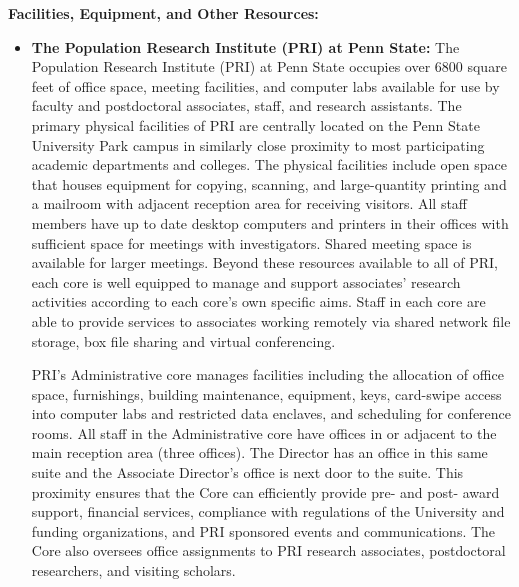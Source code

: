 \documentclass[11pt]{article}
\begin{document}
%
\pagestyle{empty} 

\noindent \textbf{Facilities, Equipment, and Other Resources:}

\begin{itemize}

\item \textbf{The Population Research Institute (PRI) at Penn State:} 
The Population Research Institute (PRI) at Penn State occupies over 6800 square feet of office space, meeting facilities, and computer labs available for use by faculty and postdoctoral associates, staff, and research assistants. The primary physical facilities of PRI are centrally located on the Penn State University Park campus in similarly close proximity to most participating academic departments and colleges. The physical facilities include open space that houses equipment for copying, scanning, and large-quantity printing and a mailroom with adjacent reception area for receiving visitors. All staff members have up to date desktop computers and printers in their offices with sufficient space for meetings with investigators. Shared meeting space is available for larger meetings. Beyond these resources available to all of PRI, each core is well equipped to manage and support associates’ research activities according to each core’s own specific aims. Staff in each core are able to provide services to associates working remotely via shared network file storage, box file sharing and virtual conferencing.  

 

PRI’s Administrative core manages facilities including the allocation of office space, furnishings, building maintenance, equipment, keys, card-swipe access into computer labs and restricted data enclaves, and scheduling for conference rooms. All staff in the Administrative core have offices in or adjacent to the main reception area (three offices). The Director has an office in this same suite and the Associate Director’s office is next door to the suite. This proximity ensures that the Core can efficiently provide pre- and post- award support, financial services, compliance with regulations of the University and funding organizations, and PRI sponsored events and communications. The Core also oversees office assignments to PRI research associates, postdoctoral researchers, and visiting scholars.  

 


\end{itemize}
\end{document}

